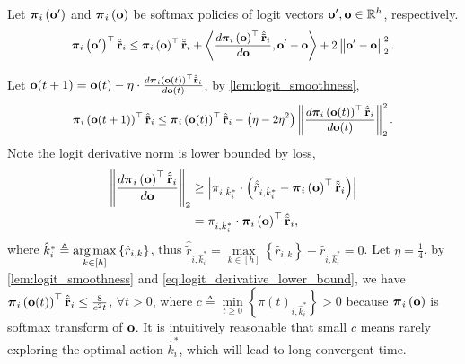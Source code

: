 \begin{lem}
\label{lem:logit_smoothness}
Let ${\boldsymbol{\pi}}_i\left( {\mathbf{o}}^\prime \right)$ and ${\boldsymbol{\pi}}_i\left( {\mathbf{o}} \right)$ be softmax policies of logit vectors ${\mathbf{o}}^\prime, {\mathbf{o}} \in {\mathbb{R}}^h$, respectively.
\begin{equation*}
\small
    \rvpi_i\left( \rvo^\prime \right)^\top \hat{\rvtilder}_i \le \rvpi_i\left( \rvo \right)^\top \hat{\rvtilder}_i + \left\langle \frac{d \rvpi_i\left( \rvo \right)^\top \hat{\rvtilder}_i}{d \rvo}, \rvo^\prime - \rvo \right\rangle + 2 \left\| \rvo^\prime - \rvo \right\|_2^2.
\end{equation*}
\end{lem}
Let ${\mathbf{o}}(t+1) = {\mathbf{o}}(t) - \eta \cdot \frac{d {\boldsymbol{\pi}}_i\left( {\mathbf{o}}(t) \right)^\top \hat{{\tilde{\mathbf{r}}}}_i}{d {\mathbf{o}}(t)}$, by \cref{lem:logit_smoothness},
\begin{equation*}
\begin{split}
\small
    \rvpi_i\left( \rvo(t+1) \right)^\top \hat{\rvtilder}_i \le \rvpi_i\left( \rvo(t) \right)^\top \hat{\rvtilder}_i - \left( \eta - 2 \eta^2 \right) \left\| \frac{d \rvpi_i\left( \rvo(t) \right)^\top \hat{\rvtilder}_i}{d \rvo(t)} \right\|_2^2.
\end{split}
\end{equation*}
Note the logit derivative norm is lower bounded by loss,
\begin{equation}
\label{eq:logit_derivative_lower_bound}
\begin{split}
    \left\| \frac{d {\boldsymbol{\pi}}_i\left( {\mathbf{o}} \right)^\top \hat{{\tilde{\mathbf{r}}}}_i}{d {\mathbf{o}}} \right\|_2 &\ge \left| \pi_{i,\hat{k}_i^*} \cdot \left( \hat{\tilde{r}}_{i,\hat{k}_i^*} - {\boldsymbol{\pi}}_i\left( {\mathbf{o}} \right)^\top \hat{{\tilde{\mathbf{r}}}}_i \right) \right| \\
    &= \pi_{i,\hat{k}_i^*} \cdot {\boldsymbol{\pi}}_i\left( {\mathbf{o}} \right)^\top \hat{{\tilde{\mathbf{r}}}}_i,
\end{split}
\end{equation}
where $\hat{k}_i^* \triangleq \operatorname*{arg\,max}\limits_{ k \in [h]}{\left\{ \hat{r}_{i, k} \right\}}$, thus $\hat{\tilde{r}}_{i,\hat{k}_i^*} = \max\limits_{k \in [h]}{\left\{ \hat{r}_{i, k} \right\}} - \hat{r}_{i, \hat{k}_i^*} = 0$. Let $\eta = \frac{1}{4}$, by \cref{lem:logit_smoothness} and \cref{eq:logit_derivative_lower_bound}, we have ${\boldsymbol{\pi}}_i\left( {\mathbf{o}}(t) \right)^\top \hat{{\tilde{\mathbf{r}}}}_i \le \frac{8}{c^2 t}$, $\forall t > 0$, where $c \triangleq \min\limits_{t \ge 0}{ \left\{ \pi(t)_{i, \hat{k}_i^*}\right\}}  > 0$ because ${\boldsymbol{\pi}}_i\left( {\mathbf{o}} \right)$ is softmax transform of ${\mathbf{o}}$. It is intuitively reasonable that small $c$ means rarely exploring the optimal action $\hat{k}_i^*$, which will lead to long convergent time.

